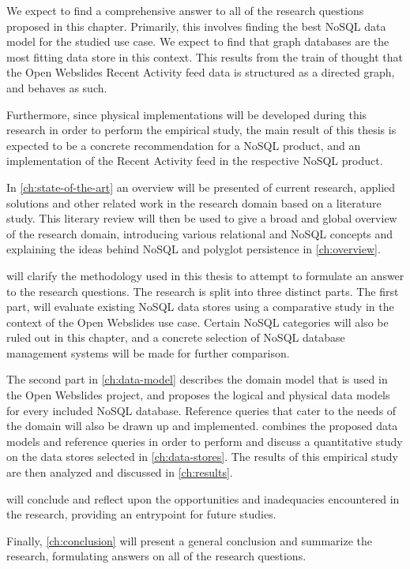 We expect to find a comprehensive answer to all of the research questions proposed in this chapter.
Primarily, this involves finding the best NoSQL data model for the studied use case.
We expect to find that graph databases are the most fitting data store in this context.
This results from the train of thought that the Open Webslides Recent Activity feed data is structured as a directed graph, and behaves as such.

Furthermore, since physical implementations will be developed during this research in order to perform the empirical study, the main result of this thesis is expected to be a concrete recommendation for a NoSQL product, and an implementation of the Recent Activity feed in the respective NoSQL product.

In \cref{ch:state-of-the-art} an overview will be presented of current research, applied solutions and other related work in the research domain based on a literature study.
This literary review will then be used to give a broad and global overview of the research domain, introducing various relational and NoSQL concepts and explaining the ideas behind NoSQL and polyglot persistence in \cref{ch:overview}.

 will clarify the methodology used in this thesis to attempt to formulate an answer to the research questions.
The research is split into three distinct parts.
The first part,  will evaluate existing NoSQL data stores using a comparative study in the context of the Open Webslides use case.
Certain NoSQL categories will also be ruled out in this chapter, and a concrete selection of NoSQL database management systems will be made for further comparison.

The second part in \cref{ch:data-model} describes the domain model that is used in the Open Webslides project, and proposes the logical and physical data models for every included NoSQL database.
Reference queries that cater to the needs of the domain will also be drawn up and implemented.
 combines the proposed data models and reference queries in order to perform and discuss a quantitative study on the data stores selected in \cref{ch:data-stores}.
The results of this empirical study are then analyzed and discussed in \cref{ch:results}.

 will conclude and reflect upon the opportunities and inadequacies encountered in the research, providing an entrypoint for future studies.

Finally, \cref{ch:conclusion} will present a general conclusion and summarize the research, formulating answers on all of the research questions.
